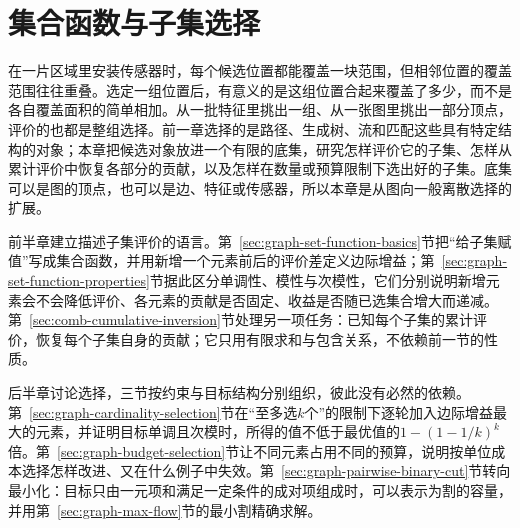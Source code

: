 \chapter{集合函数与子集选择}
\label{chap:graph-set-functions}

在一片区域里安装传感器时，每个候选位置都能覆盖一块范围，但相邻位置的覆盖范围往往重叠。选定一组位置后，有意义的是这组位置合起来覆盖了多少，而不是各自覆盖面积的简单相加。从一批特征里挑出一组、从一张图里挑出一部分顶点，评价的也都是整组选择。前一章选择的是路径、生成树、流和匹配这些具有特定结构的对象；本章把候选对象放进一个有限的底集，研究怎样评价它的子集、怎样从累计评价中恢复各部分的贡献，以及怎样在数量或预算限制下选出好的子集。底集可以是图的顶点，也可以是边、特征或传感器，所以本章是从图向一般离散选择的扩展。

前半章建立描述子集评价的语言。第~\ref{sec:graph-set-function-basics}节把“给子集赋值”写成集合函数，并用新增一个元素前后的评价差定义边际增益；第~\ref{sec:graph-set-function-properties}节据此区分单调性、模性与次模性，它们分别说明新增元素会不会降低评价、各元素的贡献是否固定、收益是否随已选集合增大而递减。第~\ref{sec:comb-cumulative-inversion}节处理另一项任务：已知每个子集的累计评价，恢复每个子集自身的贡献；它只用有限求和与包含关系，不依赖前一节的性质。

后半章讨论选择，三节按约束与目标结构分别组织，彼此没有必然的依赖。第~\ref{sec:graph-cardinality-selection}节在“至多选$k$个”的限制下逐轮加入边际增益最大的元素，并证明目标单调且次模时，所得的值不低于最优值的$1-(1-1/k)^k$倍。第~\ref{sec:graph-budget-selection}节让不同元素占用不同的预算，说明按单位成本选择怎样改进、又在什么例子中失效。第~\ref{sec:graph-pairwise-binary-cut}节转向最小化：目标只由一元项和满足一定条件的成对项组成时，可以表示为割的容量，并用第~\ref{sec:graph-max-flow}节的最小割精确求解。









